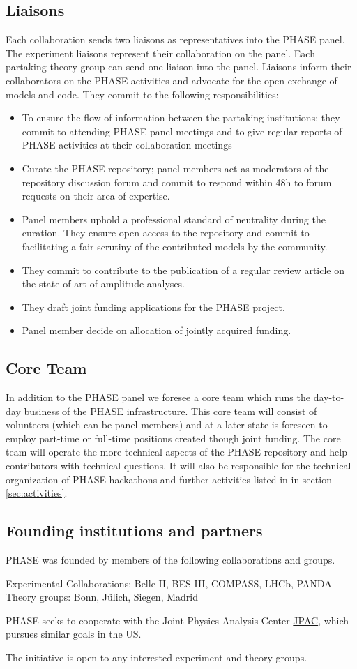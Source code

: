 \subsection{Liaisons}
Each collaboration sends two liaisons as representatives into the PHASE panel. The experiment liaisons represent their collaboration on the panel. Each partaking theory group can send one liaison into the panel. Liaisons inform their collaborators on the PHASE activities and advocate for the open exchange of models and code. They commit to the following responsibilities:
\begin{itemize}
\item To ensure the flow of information between the partaking institutions; they commit to attending PHASE panel meetings and to give regular reports of PHASE activities at their collaboration meetings
\item Curate the PHASE repository; panel members act as moderators of the repository discussion forum and commit to respond within 48h to forum requests on their area of expertise. 
\item Panel members uphold a professional standard of neutrality during the curation. They ensure open access to the repository and commit to facilitating a fair scrutiny of the contributed models by the community. 
\item They commit to contribute to the publication of a regular review article on the state of art of amplitude analyses.
\item They draft joint funding applications for the PHASE project.
\item Panel member decide on allocation of jointly acquired funding.
\end{itemize}

\subsection{Core Team}
In addition to the PHASE panel we foresee a core team which runs the day-to-day business of the PHASE infrastructure. This core team will consist of volunteers (which can be panel members) and at a later state is foreseen to employ part-time or full-time positions created though joint funding. The core team will operate the more technical aspects of the PHASE repository and help contributors with technical questions. It will also be responsible for the technical organization of PHASE hackathons and further activities listed in in section \ref{sec:activities}.

\subsection{Founding institutions and partners}
PHASE was founded by members of the following collaborations and groups.

Experimental Collaborations: Belle II, BES III, COMPASS, LHCb, PANDA \\
Theory groups: Bonn, J\"ulich, Siegen, Madrid

PHASE seeks to cooperate with the Joint Physics Analysis Center \href{https://jpac.jlab.org/}{JPAC}, which pursues similar goals in the US.

The initiative is open to any interested experiment and theory groups.